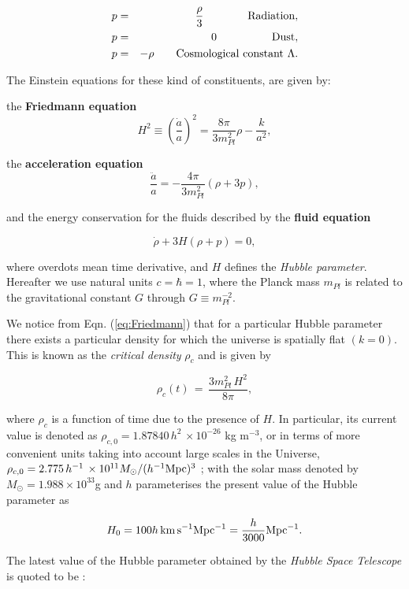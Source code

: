 \documentclass{rmaa}
\def\beq{\begin{equation}}
\def\eeq{\end{equation}}
\begin{document}
\begin{eqnarray}
p&=& \frac{\rho}{3} \qquad \qquad {\rm Radiation}, \nonumber \\
p&=&0 \qquad \qquad \quad {\rm Dust}, \\
p&=&-\rho  \qquad {\rm Cosmological~ constant}~ \Lambda. \nonumber
\end{eqnarray}

\noindent
The Einstein equations for these kind of constituents, are given by:

\noindent
the {\bf Friedmann equation}
\beq\label{eq:Friedmann}
H^2  \equiv  \left(\frac{\dot a}{a} \right)^2 = \frac{8\pi}{3 m^2_{Pl}} \rho  - \frac{k}{a^2}, 
\eeq

\noindent
the {\bf acceleration equation}
\beq \label{eq:Acce}
\frac{\ddot{a}}{a}  =   - \frac{4\pi }{3 m^2_{Pl}} (\rho +3p),
\eeq

\noindent
and the energy conservation for the fluids described by the {\bf fluid equation}

\begin{equation}
\dot \rho + 3H(\rho + p)=0,
\end{equation}

\noindent
where overdots mean time derivative, and $H$ defines the \textit{Hubble parameter}. Hereafter we use natural units
$c=\hbar=1$, where the Planck mass $m_{Pl}$ is related to the gravitational constant $G$ through $G\equiv m^{-2}_{Pl}$.


We notice from Eqn. (\ref{eq:Friedmann}) that for a particular 
Hubble parameter there exists a particular density for which the universe is spatially flat 
$(k=0)$. This is known as the {\it critical density} $\rho_c$ and is given by

\beq
\rho_c(t)\, =\, \frac{3 m^2_{Pl} \,H^2}{8\pi},
\eeq

\noindent
where $\rho_c$ is a function of time due to the presence of $H$. In particular, its current  
value is denoted as $\rho_{c,0}=1.87840\, h^2\, \times 10^{-26}$ kg m$^{-3}$, 
or in terms of more  convenient units taking into account large scales in the 
Universe,   $\rho_{c,0}= 2.775 \, h^{-1}\, \times 10^{11} M_{\odot} /(h^{-1} {\rm Mpc})^3 $ \citep{Planckck};
with the solar mass denoted by $M_{\odot}=1.988\times 10^{33}$g and $h$ parameterises the present value of the Hubble parameter as

\beq
H_0 = 100 h\, {\rm km\,s}^{-1}{\rm Mpc}^{-1} = \frac{h}{3000}{\rm Mpc}^{-1}.
\eeq

\noindent
The latest value of the Hubble parameter obtained by the \textit{Hubble Space Telescope}
is quoted to be \citep{HST}: 
\end{document}
